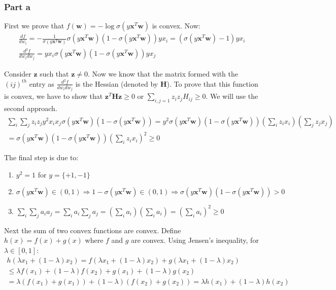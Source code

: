 \documentclass{article}
\newcommand{\vct}[1]{\mathbf{#1}}
\begin{document}
\subsubsection*{Part a}
\begin{flushleft}
First we prove that \(f(\vct{w}) = -\log \sigma(y \vct{x}^{T} \vct{w})\) is convex. Now:
\begin{gather}
\frac{df}{dw_{i}} = -\frac{1}{\sigma(y \vct{x}^{T}\vct{w})} \sigma(y \vct{x}^{T}\vct{w}) (1 - \sigma(y \vct{x}^{T}\vct{w})) yx_{i} = (\sigma(y \vct{x}^{T}\vct{w}) - 1) yx_{i}\\
\frac{d^{2}f}{dw_{i}dw_{j}} = yx_{i}\sigma(y \vct{x}^{T}\vct{w})(1 - \sigma(y \vct{x}^{T}\vct{w}))yx_{j}
\end{gather}

Consider \(\vct{z}\) such that \(\vct{z} \neq 0\). Now we know that the matrix formed with the \((ij)^{th}\) entry as \(\frac{d^{2}f}{dw_{i}dw_{j}}\) is the Hessian (denoted by \(\vct{H}\)). To prove that this function is convex, we have to show that \(\vct{z}^{T}\vct{H}\vct{z} \geq 0\) or \(\displaystyle\sum_{i, j = 1} z_{i}z_{j}H_{ij} \geq 0\). We will use the second approach.
\begin{multline}
\sum_{i}\sum_{j} z_{i}z_{j}y^{2}x_{i}x_{j}\sigma(y \vct{x}^{T}\vct{w})(1 - \sigma(y \vct{x}^{T}\vct{w})) = y^{2}\sigma(y \vct{x}^{T}\vct{w})(1 - \sigma(y \vct{x}^{T}\vct{w}))\left(\sum_{i}z_{i}x_{i}\right)\left(\sum_{j}z_{j}x_{j}\right)\\= \sigma(y \vct{x}^{T}\vct{w})(1 - \sigma(y \vct{x}^{T}\vct{w})) \left(\sum_{i} z_{i}x_{i}\right)^{2} \geq 0
\end{multline}

The final step is due to:
\begin{enumerate}
\item \(y^{2} = 1\) for \(y = \{+1, -1\}\)
\item \(\sigma(y \vct{x}^{T}\vct{w}) \in (0, 1) \Rightarrow 1 - \sigma(y \vct{x}^{T}\vct{w}) \in (0, 1) \Rightarrow \sigma(y \vct{x}^{T}\vct{w})(1 - \sigma(y \vct{x}^{T}\vct{w})) > 0\)
\item \(\displaystyle\sum_{i}\sum_{j} a_{i}a_{j} = \sum_{i}a_{i}\sum_{j}a_{j} = \left(\sum_{i}a_{i}\right)\left(\sum_{i}a_{i}\right) = \left(\sum_{i}a_{i}\right)^{2} \geq 0\)
\end{enumerate}

Next the sum of two convex functions are convex. Define \(h(x) = f(x) + g(x)\) where \(f\) and \(g\) are convex. Using Jensen's inequality, for \(\lambda \in [0, 1]\):
\begin{multline}
h(\lambda x_{1} + (1 - \lambda)x_{2}) = f(\lambda x_{1} + (1 - \lambda)x_{2}) + g(\lambda x_{1} + (1 - \lambda)x_{2})\\\leq \lambda f(x_{1}) + (1 - \lambda)f(x_{2}) + g(x_{1}) + (1 - \lambda)g(x_{2})\\= \lambda(f(x_{1}) + g(x_{1})) + (1 - \lambda)(f(x_{2}) + g(x_{2}))=\lambda h(x_{1}) + (1 - \lambda)h(x_{2})
\end{multline}


\end{flushleft}
\end{document}
